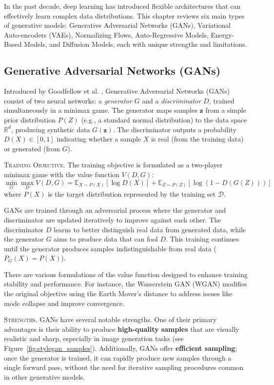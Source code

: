 In the past decade, deep learning has introduced flexible architectures that can effectively learn complex data distributions. This chapter reviews six main types of generative models: Generative Adversarial Networks (GANs), Variational Auto-encoders (VAEs), Normalizing Flows, Auto-Regressive Models, Energy-Based Models, and Diffusion Models, each with unique strengths and limitations.

\subsection{Generative Adversarial Networks (GANs)}\label{sec:gans}

Introduced by Goodfellow et al. \cite{goodfellow2014generative}, Generative Adversarial Networks (GANs) consist of two neural networks: a \textit{generator} \( G \) and a \textit{discriminator} \( D \), trained simultaneously in a minimax game. The generator maps samples \( \mathbf{z} \) from a simple prior distribution \( P(Z) \) (e.g., a standard normal distribution) to the data space \( \mathbb{R}^d \), producing synthetic data \( G(\mathbf{z}) \). The discriminator outputs a probability \( D(X) \in [0,1] \) indicating whether a sample \( X \) is real (from the training data) or generated (from \( G \)).

\textsc{Training Objective.} The training objective is formulated as a two-player minimax game with the value function \( V(D, G) \):
\[
\min_{G} \max_{D} V(D, G) = \mathbb{E}_{X \sim P(X)} [\log D(X)] + \mathbb{E}_{Z \sim P(Z)} [\log (1 - D(G(Z)))]
\]
where \( P(X) \) is the target distribution represented by the training set \( \mathcal{D} \).


GANs are trained through an adversarial process where the generator and discriminator are updated iteratively to improve against each other. The discriminator \( D \) learns to better distinguish real data from generated data, while the generator \( G \) aims to produce data that can fool \( D \). This training continues until the generator produces samples indistinguishable from real data (\( P_G(X) = P(X) \)).

There are various formulations of the value function designed to enhance training stability and performance. For instance, the Wasserstein GAN (WGAN) \cite{arjovsky2017wasserstein} modifies the original objective using the Earth Mover's distance to address issues like mode collapse and improve convergence.

\textsc{Strengths.} GANs have several notable strengths. One of their primary advantages is their ability to produce \textbf{high-quality samples} that are visually realistic and sharp, especially in image generation tasks (see Figure~\ref{fig:stylegan_samples}). Additionally, GANs offer \textbf{efficient sampling}; once the generator is trained, it can rapidly produce new samples through a single forward pass, without the need for iterative sampling procedures common in other generative models.

